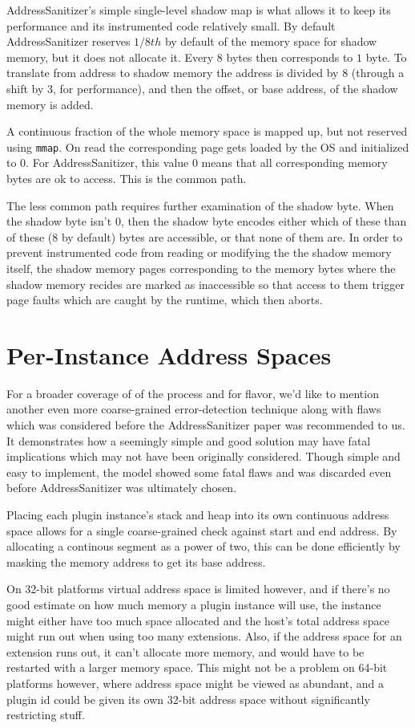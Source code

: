 AddressSanitizer's simple single-level shadow map is what allows it to keep its
performance and its instrumented code relatively small.
By default AddressSanitizer reserves $1/8th$ by default of the memory space for
shadow memory, but it does not allocate it.
Every $8$ bytes then corresponds to $1$ byte.
To translate from address to shadow memory the address is divided by $8$
(through a shift by $3$, for performance), and then the offset, or base address,
of the shadow memory is added.

A continuous fraction of the whole memory space is mapped up, but not reserved
using \texttt{mmap}.
On read the corresponding page gets loaded by the OS and initialized to $0$.
For AddressSanitizer, this value $0$ means that all corresponding memory bytes
are ok to access.
This is the common path.

The less common path requires further examination of the shadow byte.
When the shadow byte isn't $0$, then the shadow byte encodes either which of
these than of these ($8$ by default) bytes are accessible, or that none of them
are.
In order to prevent instrumented code from reading or modifying the the shadow
memory itself, the shadow memory pages corresponding to the memory bytes where
the shadow memory recides are marked as inaccessible so that access to them
trigger page faults which are caught by the runtime, which then aborts.


\section {Per-Instance Address Spaces}

For a broader coverage of of the process and for flavor, we'd like to mention
another even more coarse-grained error-detection technique along with flaws
which was considered before the AddressSanitizer paper was recommended to us.
It demonstrates how a seemingly simple and good solution may have fatal
implications which may not have been originally considered.
Though simple and easy to implement, the model showed some fatal flaws and was
discarded even before AddressSanitizer was ultimately chosen.

Placing each plugin instance's stack and heap into its own continuous address
space allows for a single coarse-grained check against start and end address.
By allocating a continous segment as a power of two, this can be done 
efficiently by masking the memory address to get its base address.

On 32-bit platforms virtual address space is limited however, and if there's no
good estimate on how much memory a plugin instance will use, the instance might
either have too much space allocated and the host's total address space
might run out when using too many extensions.
Also, if the address space for an extension runs out, it can't allocate more
memory, and would have to be restarted with a larger memory space.
This might not be a problem on 64-bit platforms however, where address space
might be viewed as abundant, and a plugin id could be given its own 32-bit
address space without significantly restricting stuff.

